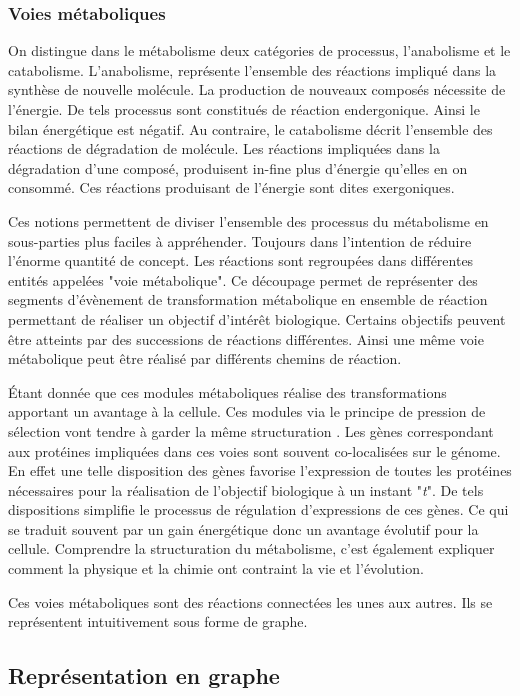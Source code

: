 \begin{refsegment}
    
    \subsubsection{Voies métaboliques}
    On distingue dans le métabolisme deux catégories de processus, l'anabolisme et le catabolisme. L'anabolisme, représente l'ensemble des réactions impliqué dans la synthèse de nouvelle molécule. La production de nouveaux composés nécessite de l'énergie. De tels processus sont constitués de réaction endergonique. Ainsi le bilan énergétique est négatif.  Au contraire, le catabolisme décrit l'ensemble des réactions de dégradation de molécule. Les réactions impliquées dans la dégradation d'une composé, produisent in-fine plus d'énergie qu'elles en on consommé. Ces réactions produisant de l'énergie sont dites exergoniques.
    
    Ces notions permettent de diviser l'ensemble des processus du métabolisme en sous-parties plus faciles à appréhender. Toujours dans l'intention de réduire l'énorme quantité de concept. Les réactions sont regroupées dans différentes entités appelées "voie métabolique". Ce découpage permet de représenter des segments d'évènement de transformation métabolique en ensemble de réaction permettant de réaliser un objectif d'intérêt biologique. Certains objectifs peuvent être atteints par des successions de réactions différentes. Ainsi une même voie métabolique peut être réalisé par différents chemins de réaction.
    
    Étant donnée que ces modules métaboliques réalise des transformations apportant un avantage à la cellule. Ces modules via le principe de pression de sélection vont tendre à garder la même structuration \cite{braakman2012compositional}. Les gènes correspondant aux protéines impliquées dans ces voies sont souvent co-localisées sur le génome. En effet une telle disposition des gènes favorise l'expression de toutes les protéines nécessaires pour la réalisation de l'objectif biologique à un instant "\textit{t}". De tels dispositions simplifie le processus de régulation d'expressions de ces gènes. Ce qui se traduit souvent par un gain énergétique donc un avantage évolutif pour la cellule. Comprendre la structuration du métabolisme, c'est également expliquer comment la physique et la chimie ont contraint la vie et l'évolution.
    
    Ces voies métaboliques sont des réactions connectées les unes aux autres. Ils se représentent intuitivement sous forme de graphe.
    
    \subsection{Représentation en graphe}
    

\end{refsegment}
